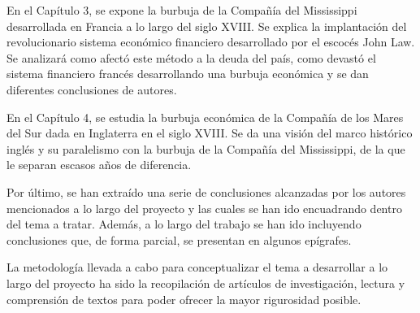 En el Capítulo 3, se expone la burbuja de la Compañía del Mississippi
desarrollada en Francia a lo largo del siglo XVIII. Se explica la
implantación del revolucionario sistema económico financiero
desarrollado por el escocés John Law. Se analizará como afectó este
método a la deuda del país, como devastó el sistema financiero francés
desarrollando una burbuja económica y se dan diferentes conclusiones
de autores. 

En el Capítulo 4, se estudia la burbuja económica de la Compañía de los
Mares del Sur dada en Inglaterra en el siglo XVIII. Se da una visión
del marco histórico inglés y su paralelismo con la burbuja de la
Compañía del Mississippi, de la que le separan escasos años de
diferencia. 

Por último, se han extraído una serie de conclusiones alcanzadas por los
autores mencionados a lo largo del proyecto y las cuales se han ido
encuadrando dentro del tema a tratar. Además, a lo largo del trabajo se
han ido incluyendo conclusiones que, de forma parcial, se presentan en
algunos epígrafes.

La metodología llevada a cabo para conceptualizar el tema a desarrollar
a lo largo del proyecto ha sido la recopilación de artículos de
investigación, lectura y comprensión de textos para poder ofrecer la
mayor rigurosidad posible. 
